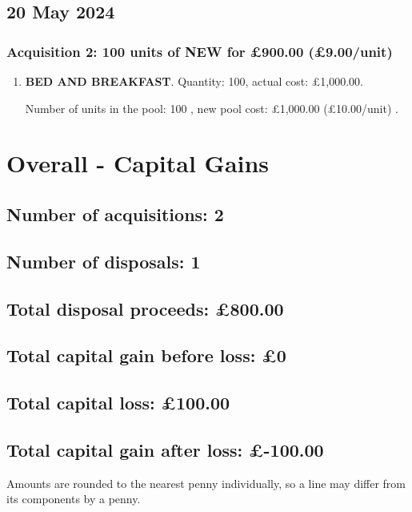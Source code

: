 \documentclass{article}
\begin{document}
\subsection*{20 May 2024}
\subsubsection*{
    Acquisition 2: 100 units of NEW for £900.00
    (£9.00/unit)%
}

\begin{enumerate}
\item \textbf{BED AND BREAKFAST}. Quantity: 100,
    actual cost: £1,000.00.

    Number of units in the pool:
    100%
,
    new pool cost: £1,000.00
    (£10.00/unit)%
.

\end{enumerate}




\clearpage
\section*{Overall - Capital Gains}
\subsection*{Number of acquisitions: 2}
\subsection*{Number of disposals: 1}
\subsection*{Total disposal proceeds: £800.00}
\subsection*{Total capital gain before loss: £0}
\subsection*{Total capital loss: £100.00}
\subsection*{Total capital gain after loss: £-100.00}
\vspace{1em}
Amounts are rounded to the nearest penny individually, so a line may differ from its components by a penny.
\vspace{2em}
\end{document}
